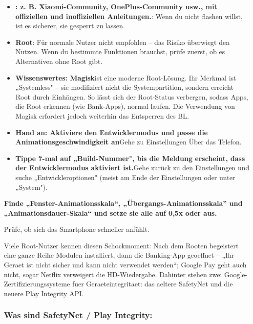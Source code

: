 \begin{itemize}
  \item \textbf{: z. B. Xiaomi-Community, OnePlus-Community usw., mit offiziellen und inoffiziellen Anleitungen.}: Wenn du nicht flashen willst, ist es sicherer, sie gesperrt zu lassen.
  \item \textbf{Root}: Für normale Nutzer nicht empfohlen – das Risiko überwiegt den Nutzen. Wenn du bestimmte Funktionen brauchst, prüfe zuerst, ob es Alternativen ohne Root gibt.
  \item \textbf{Wissenswertes: Magisk}ist eine moderne Root-Lösung. Ihr Merkmal ist „Systemless" – sie modifiziert nicht die Systempartition, sondern erreicht Root durch Einhängen. So lässt sich der Root-Status verbergen, sodass Apps, die Root erkennen (wie Bank-Apps), normal laufen. Die Verwendung von Magisk erfordert jedoch weiterhin das Entsperren des BL.
  \item \textbf{Hand an: Aktiviere den Entwicklermodus und passe die Animationsgeschwindigkeit an}Gehe zu Einstellungen Über das Telefon.
  \item \textbf{Tippe 7-mal auf „Build-Nummer", bis die Meldung erscheint, dass der Entwicklermodus aktiviert ist.}Gehe zurück zu den Einstellungen und suche „Entwickleroptionen" (meist am Ende der Einstellungen oder unter „System").
\end{itemize}

\textbf{Finde „Fenster-Animationsskala“, „Übergangs-Animationsskala” und „Animationsdauer-Skala“ und setze sie alle auf 0,5x oder aus.}\par

Prüfe, ob sich das Smartphone schneller anfühlt.


Viele Root-Nutzer kennen diesen Schockmoment: Nach dem Rooten begeistert eine ganze Reihe Modulen installiert, dann die Banking-App geoeffnet – „Ihr Geraet ist nicht sicher und kann nicht verwendet werden“; Google Pay geht auch nicht, sogar Netflix verweigert die HD-Wiedergabe. Dahinter stehen zwei Google-Zertifizierungssysteme fuer Geraeteintegritaet: das aeltere SafetyNet und die neuere Play Integrity API.

\subsubsection*{Was sind SafetyNet / Play Integrity:}

